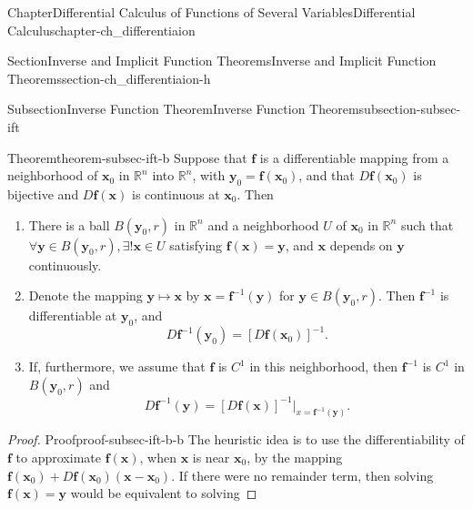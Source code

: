 \documentclass[oneside,10pt,]{book}
\numberwithin{equation}{section}
\newcommand{\bx}{\mathbf{x}}
\begin{document}
\begin{chapterptx}{Chapter}{Differential Calculus of Functions of Several Variables}{}{Differential Calculus}{}{}{chapter-ch_differentiaion}
\begin{sectionptx}{Section}{Inverse and Implicit Function Theorems}{}{Inverse and Implicit Function Theorems}{}{}{section-ch_differentiaion-h}
%
%
\typeout{************************************************}
\typeout{************************************************}
%
\begin{subsectionptx}{Subsection}{Inverse Function Theorem}{}{Inverse Function Theorem}{}{}{subsection-subsec-ift}
\begin{theorem}{Theorem}{}{}{theorem-subsec-ift-b}%
Suppose that \({\mathbf f}\) is a differentiable mapping from a neighborhood of \({\mathbf x}_0\) in \(\mathbb R^n\) into \(\mathbb R^n\), with \({\mathbf y}_0 = {\mathbf f}({\mathbf x}_0)\), and that \(D {\mathbf f}({\mathbf x}_{0})\) is bijective and  \(D {\mathbf f}({\mathbf x})\) is continuous at \({\mathbf x}_{0}\).  Then %
\begin{enumerate}
\item{}There is a ball \(B({\mathbf y}_0, r)\) in \(\mathbb R^n\) and a neighborhood \(U\) of \({\mathbf x}_0\) in \(\mathbb R^n\) such that \(\forall {\mathbf y} \in B({\mathbf y}_0, r), \exists ! {\mathbf x} \in U\) satisfying \({\mathbf f}({\mathbf x}) = {\mathbf y}\), and \({\mathbf x}\) depends on \({\mathbf y}\) continuously.%
\item{}Denote the mapping \({\mathbf y} \mapsto {\mathbf x}\) by \({\mathbf x} ={\mathbf f}^{-1} ({\mathbf y})\) for \({\mathbf y} \in B({\mathbf y}_0, r)\). Then \({\mathbf f}^{-1}\) is differentiable at \({\mathbf y}_0\), and%
\begin{equation*}
D{\mathbf f}^{-1} ({\mathbf y_{0}}) = \left[D{\mathbf f}({\mathbf x}_{0})\right]^{-1}.
\end{equation*}
%
\item{}If, furthermore, we assume that \({\mathbf f}\) is \(C^1\) in this neighborhood, then \({\mathbf f}^{-1}\) is \(C^1\) in \(B({\mathbf y}_0, r)\) and%
\begin{equation*}
D{\mathbf f}^{-1} ({\mathbf y}) = \left[D{\mathbf f}({\mathbf x})\right]^{-1}|_{x={\mathbf f}^{-1}({\mathbf y})}.
\end{equation*}
%
\end{enumerate}
\end{theorem}
\begin{proof}{Proof}{}{proof-subsec-ift-b-b}
The heuristic idea is to use the differentiability of \({\mathbf f}\) to approximate \({\mathbf f}({\mathbf x}) \), when \(\bx\) is near \(\bx_{0}\), by the mapping \({\mathbf f}({\mathbf x}_{0})+D{\mathbf f}({\mathbf x}_{0})({\mathbf x}-{\mathbf x}_{0})\). If there were no remainder term, then solving \({\mathbf f}({\mathbf x})= {\mathbf y}\) would be equivalent to solving%

\end{proof}
\end{subsectionptx}
\end{sectionptx}
\end{chapterptx}
\end{document}
